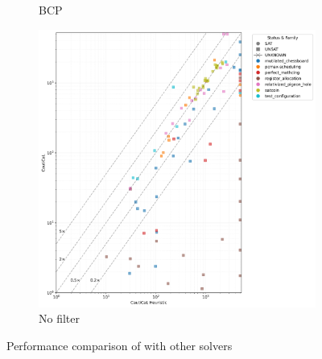 \begin{figure}[!t]
\begin{subfigure}[t]{0.3\textwidth}
        \caption{BCP}
        \label{fig:globalbcp}
    \end{subfigure}
    \begin{subfigure}[t]{0.3\textwidth}
        \centering
        \includegraphics[width=\textwidth]{figs/globaldontfilter_heuristic_comparison.jpg}
        \caption{No filter}
        \label{fig:globaldontfilter}
    \end{subfigure}

    \caption{Performance comparison of \tool with other solvers}
    \label{fig:solver-comparison}
\end{figure}

